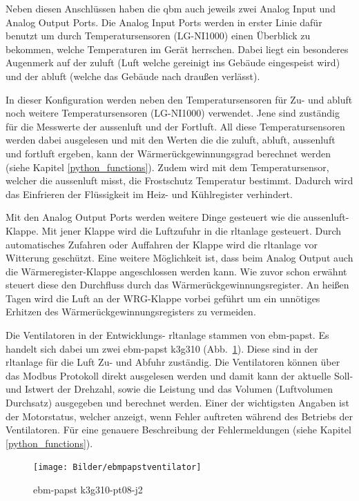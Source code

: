 Neben diesen Anschlüssen haben die \gls{qbm}  auch jeweils zwei Analog Input und Analog Output Ports. Die Analog Input Ports werden in erster Linie dafür benutzt um durch Temperatursensoren (LG-NI1000) einen Überblick zu bekommen, welche Temperaturen im Gerät herrschen. Dabei liegt ein besonderes Augenmerk auf der \gls{zuluft} (Luft welche gereinigt ins Gebäude eingespeist wird) und der \gls{abluft} (welche das Gebäude nach draußen verlässt).

In dieser Konfiguration werden neben den Temperatursensoren für Zu- und \gls{abluft} noch weitere Temperatursensoren (LG-NI1000) verwendet. Jene sind zuständig für die Messwerte der \gls{aussenluft} und der Fortluft. All diese Temperatursensoren werden dabei ausgelesen und mit den Werten die die \gls{zuluft}, \gls{abluft}, \gls{aussenluft} und \gls{fortluft} ergeben, kann der Wärmerückgewinnungsgrad berechnet werden (siehe Kapitel \ref{python_functions}). Zudem wird mit dem Temperatursensor, welcher die \gls{aussenluft} misst, die Frostschutz Temperatur bestimmt. Dadurch wird das Einfrieren der Flüssigkeit im Heiz- und Kühlregister verhindert.

Mit den Analog Output Ports werden weitere Dinge gesteuert wie \zB die \gls{aussenluft}-Klappe. Mit jener Klappe wird die Luftzufuhr in die \ac{rltanlage} gesteuert. Durch automatisches Zufahren oder Auffahren der Klappe wird die \ac{rltanlage} vor Witterung geschützt. Eine weitere Möglichkeit ist, dass beim Analog Output auch die Wärmeregister-Klappe angeschlossen werden kann. Wie zuvor schon erwähnt steuert diese den Durchfluss durch das Wärmerückgewinnungsregister. An heißen Tagen wird die Luft an der WRG-Klappe vorbei geführt um ein unnötiges Erhitzen des Wärmerückgewinnungsregisters zu vermeiden.

Die Ventilatoren in der Entwicklungs- \ac{rltanlage} stammen von ebm-papst. Es handelt sich dabei um zwei ebm-papst k3g310 (Abb.~\ref{fig:ebmpapstventilator}). Diese sind in der \ac{rltanlage} für die Luft Zu- und Abfuhr zuständig. Die Ventilatoren können über das Modbus Protokoll direkt ausgelesen werden und damit kann der aktuelle Soll- und Istwert der Drehzahl, sowie die Leistung und das Volumen (Luftvolumen Durchsatz) ausgegeben und berechnet werden. Einer der wichtigsten Angaben ist der Motorstatus, welcher anzeigt, wenn Fehler auftreten während des Betriebs der Ventilatoren. Für eine genauere Beschreibung der Fehlermeldungen (siehe Kapitel \ref{python_functions}).

\begin{figure}[H]
	\centering
	\texttt{[image: Bilder/ebmpapstventilator]}
	\caption{ebm-papst k3g310-pt08-j2} 
	\label{fig:ebmpapstventilator}
\end{figure}

